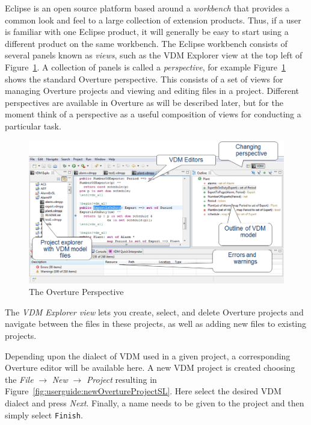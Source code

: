 \documentclass{overturerepchap}
\begin{document}
Eclipse is an open source platform based around a
\emph{workbench} that provides a common look and feel
to a large collection of extension products. Thus, if a user is
familiar with one Eclipse product, it will generally be easy to start
using a different product on the same workbench. The Eclipse workbench
consists of several panels known as \emph{views}, such as
the VDM Explorer view at the top left of
Figure~\ref{fig:userguire:OverturePerspective}. A collection of panels
is called a \emph{perspective}, for example
Figure~\ref{fig:userguire:OverturePerspective} shows the standard
Overture perspective. This consists of a set of views for managing
Overture projects and viewing and editing files in a
project. Different perspectives are available in Overture as will be
described later, but for the moment think of a perspective as a
useful composition of views for conducting a particular task.

\begin{figure}[!h]
\begin{center}
  \includegraphics[width=\textwidth]{figures/OverturePerspective}
  \caption[labelInTOC]{The Overture Perspective}
  \label{fig:userguire:OverturePerspective}
\end{center}
\end{figure}

The \emph{VDM Explorer view} lets you create, select, 
and delete Overture projects and navigate between the files in these 
projects, as well as adding new files to existing projects.

Depending upon the dialect of VDM used in a given project,
a corresponding Overture editor will be available here. A new VDM
project is created choosing the \emph{File} $ \rightarrow$ \emph{New}
$\rightarrow$ \emph{Project} resulting in
Figure~\ref{fig:userguide:newOvertureProjectSL}. Here select
the desired VDM dialect and press \emph{Next}. Finally, a name needs 
to be given to the project and then simply select \texttt{Finish}. 
\end{document}
